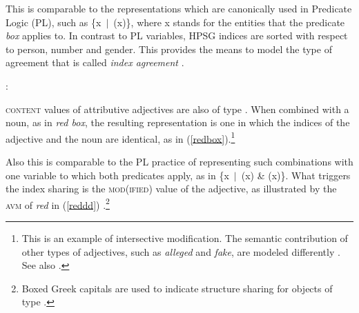 \documentclass[output=paper
	        ,collection
	        ,collectionchapter
 	        ,biblatex
                ,babelshorthands
                ,newtxmath
                ,draftmode
                ,colorlinks, citecolor=brown
]{langscibook}
\begin{document}
\ea\label{red} 
\z

\noindent
This is comparable to the representations which are canonically used in 
Predicate Logic (PL), such as \{x~$|$~(x)\}, where x stands for 
the entities that the predicate \emph{box} applies to. In contrast to 
PL variables, HPSG indices are sorted with respect to person, number 
and gender. This provides the means to model the type of agreement that 
is called \emph{index agreement} .

\begin{exe} 
\ex  {}:  
\end{exe} 

\textsc{content} values of attributive adjectives are also of type . 
When combined with a noun, as in \emph{red box}, the resulting representation 
is one in which the indices of the adjective and the noun are identical, as in 
(\ref{redbox}).\footnote{This is an example of intersective modification. 
The semantic contribution of other types of adjectives, such as  
\emph{alleged} and \emph{fake}, are modeled differently \citep[330--331]{ps2}. See also
.}   

\begin{exe} 
\ex\label{redbox} 
\end{exe}

\noindent
Also this is comparable to the PL practice of representing such 
combinations with one variable to which both predicates apply, as in 
\{x~$|$~(x) \& (x)\}. What triggers the index sharing is 
the \textsc{mod(ified)} value of the adjective, as illustrated by the \textsc{avm} of 
\emph{red} in (\ref{reddd}) \citep[55]{ps2}.\footnote{Boxed Greek capitals
are used to indicate structure sharing for objects of 
type  \citep[]{GS00}.} 
\end{document}
